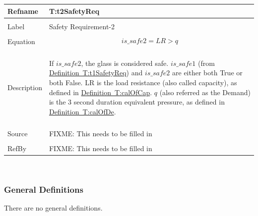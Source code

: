\documentclass[12pt]{article}
\begin{document}
\noindent \begin{minipage}{\textwidth}
\begin{tabular}{p{} p{}}
\toprule \textbf{Refname} & \textbf{T:t2SafetyReq}
\label{T:t2SafetyReq}
\\ \midrule \\
Label & Safety Requirement-2
\\ \midrule \\
Equation & \begin{dmath}
           is\_safe2=LR>q
           \end{dmath}
\\ \midrule \\
Description & \begin{description}
If $is\_safe2$, the glass is considered safe. $is\_safe1$ (from \hyperref[T:t1SafetyReq]{Definition~T:t1SafetyReq}) and $is\_safe2$ are either both True or both False. LR is the load resistance (also called capacity), as defined in \hyperref[T:calOfCap]{Definition~T:calOfCap}. $q$ (also referred as the Demand) is the 3 second duration equivalent pressure, as defined in \hyperref[T:calOfDe]{Definition~T:calOfDe}.
              \end{description}
\\ \midrule \\
Source & FIXME: This needs to be filled in
\\ \midrule \\
RefBy & FIXME: This needs to be filled in
\\ \bottomrule \end{tabular}
\end{minipage}\\
\subsubsection{General Definitions}
\label{Sec:GDs}
There are no general definitions.
\end{document}
